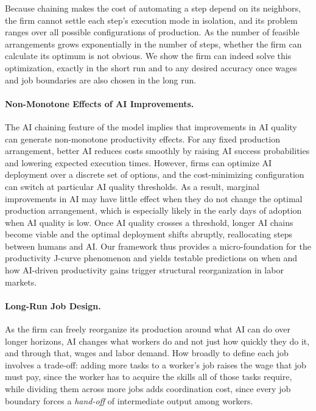 Because chaining makes the cost of automating a step depend on its neighbors, the firm cannot settle each step's execution mode in isolation, and its problem ranges over all possible configurations of production.
As the number of feasible arrangements grows exponentially in the number of steps, whether the firm can calculate its optimum is not obvious.
We show the firm can indeed solve this optimization, exactly in the short run and to any desired accuracy once wages and job boundaries are also chosen in the long run.


\paragraph{Non-Monotone Effects of AI Improvements.}
The AI chaining feature of the model implies that improvements in AI quality can generate non-monotone productivity effects.
For any fixed production arrangement, better AI reduces costs smoothly by raising AI success probabilities and lowering expected execution times.
However, firms can optimize AI deployment over a discrete set of options, and the cost-minimizing configuration can switch at particular AI quality thresholds.
As a result, marginal improvements in AI may have little effect when they do not change the optimal production arrangement, which is especially likely in the early days of adoption when AI quality is low.
Once AI quality crosses a threshold, longer AI chains become viable and the optimal deployment shifts abruptly, reallocating steps between humans and AI.
Our framework thus provides a micro-foundation for the productivity J-curve phenomenon \citep{brynjolfsson2021productivity} and yields testable predictions on when and how AI-driven productivity gains trigger structural reorganization in labor markets.


\paragraph{Long-Run Job Design.}
As the firm can freely reorganize its production around what AI can do over longer horizons, AI changes what workers do and not just how quickly they do it, and through that, wages and labor demand.
How broadly to define each job involves a trade-off: adding more tasks to a worker's job raises the wage that job must pay, since the worker has to acquire the skills all of those tasks require, while dividing them across more jobs adds coordination cost, since every job boundary forces a \emph{hand-off} of intermediate output among workers.

